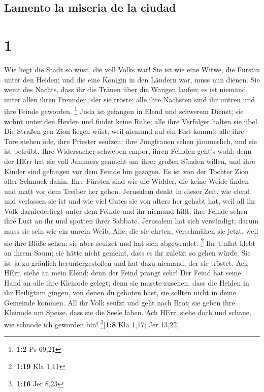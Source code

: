 \hypertarget{lamento-la-miseria-de-la-ciudad}{%
\subsection{Lamento la miseria de la
ciudad}\label{lamento-la-miseria-de-la-ciudad}}

\hypertarget{section}{%
\section{1}\label{section}}

 Wie liegt die Stadt so wüst, die voll Volks war! Sie ist
wie eine Witwe, die Fürstin unter den Heiden; und die eine Königin in
den Ländern war, muss nun dienen.  Sie weint des Nachts,
dass ihr die Tränen über die Wangen laufen; es ist niemand unter allen
ihren Freunden, der sie tröste; alle ihre Nächsten sind ihr untreu und
ihre Feinde geworden. \footnote{\textbf{1:2} Ps 69,21} 
Juda ist gefangen in Elend und schwerem Dienst; sie wohnt unter den
Heiden und findet keine Ruhe; alle ihre Verfolger halten sie übel.
 Die Straßen gen Zion liegen wüst; weil niemand auf ein
Fest kommt; alle ihre Tore stehen öde, ihre Priester seufzen; ihre
Jungfrauen sehen jämmerlich, und sie ist betrübt.  Ihre
Widersacher schweben empor, ihren Feinden geht's wohl; denn der HErr hat
sie voll Jammers gemacht um ihrer großen Sünden willen, und ihre Kinder
sind gefangen vor dem Feinde hin gezogen.  Es ist von der
Tochter Zion aller Schmuck dahin. Ihre Fürsten sind wie die Widder, die
keine Weide finden und matt vor dem Treiber her gehen. 
Jerusalem denkt in dieser Zeit, wie elend und verlassen sie ist und wie
viel Gutes sie von alters her gehabt hat, weil all ihr Volk
darniederliegt unter dem Feinde und ihr niemand hilft; ihre Feinde sehen
ihre Lust an ihr und spotten ihrer Sabbate.  Jerusalem hat
sich versündigt; darum muss sie sein wie ein unrein Weib. Alle, die sie
ehrten, verschmähen sie jetzt, weil sie ihre Blöße sehen; sie aber
seufzet und hat sich abgewendet. \footnote{\textbf{1:19} Kla 1,11}
 Ihr Unflat klebt an ihrem Saum; sie hätte nicht gemeint,
dass es ihr zuletzt so gehen würde. Sie ist ja zu gräulich
heruntergestoßen und hat dazu niemand, der sie tröstet. Ach HErr, siehe
an mein Elend; denn der Feind prangt sehr!  Der Feind hat
seine Hand an alle ihre Kleinode gelegt; denn sie musste zusehen, dass
die Heiden in ihr Heiligtum gingen, von denen du geboten hast, sie
sollten nicht in deine Gemeinde kommen.  All ihr Volk
seufzt und geht nach Brot; sie geben ihre Kleinode um Speise, dass sie
die Seele laben. Ach HErr, siehe doch und schaue, wie schnöde ich
geworden bin! \footnote{\textbf{1:16} Jer 8,23}{[}\textbf{1:8} Kla 1,17;
Jer 13,22{]}

